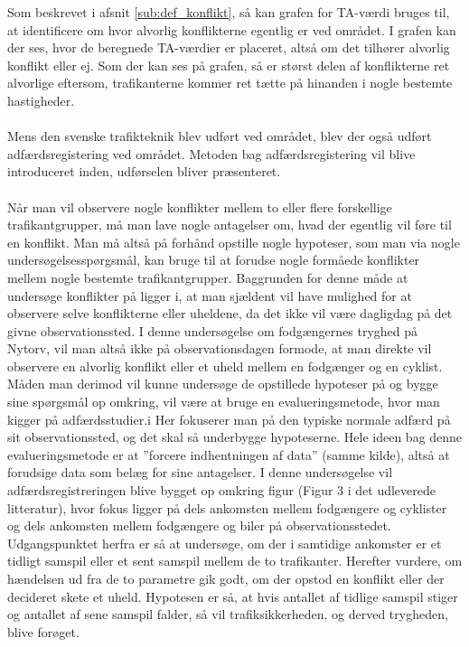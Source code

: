 Som beskrevet i afsnit \cref{sub:def_konflikt}, så kan grafen for TA-værdi bruges til, at identificere om hvor alvorlig konflikterne egentlig er ved området. I grafen kan der ses, hvor de beregnede TA-værdier er placeret, altså om det tilhører alvorlig konflikt eller ej.
Som der kan ses på grafen, så er størst delen af konflikterne ret alvorlige eftersom, trafikanterne kommer ret tætte på hinanden i nogle bestemte hastigheder.
\\\\
Mens den svenske trafikteknik blev udført ved området, blev der også udført adfærdsregistering ved området. Metoden bag adfærdsregistering vil blive introduceret inden, udførselen bliver præsenteret.\\\\
Når	man	vil	observere	nogle	konflikter	mellem	to	eller	flere	forskellige trafikantgrupper,	må	man	lave	nogle	antagelser	om,	hvad	der	egentlig	vil	føre	til	en konflikt.	Man	må	altså	på	forhånd	opstille	nogle	hypoteser,	som	man	via	nogle undersøgelsesspørgsmål,	kan	bruge	til	at	forudse	nogle	formåede	konflikter	mellem nogle	bestemte	trafikantgrupper.	Baggrunden	for	denne	måde	at	undersøge konflikter	på ligger	i,	at	man	sjældent	vil	have	mulighed	for	at	observere	selve konflikterne	eller	uheldene,	da	det	ikke	vil	være	dagligdag	på	det	givne observationssted.	I	denne	undersøgelse	om	fodgængernes	tryghed	på	Nytorv,	vil man altså	ikke	på	observationsdagen	formode,	at	man direkte	vil	observere en alvorlig	konflikt	eller	et	uheld	mellem	en	fodgænger	og	en	cyklist.	Måden	man derimod	vil	kunne	undersøge	de	opstillede	hypoteser	på	og	bygge	sine	spørgsmål	op omkring,	vil	være	at	bruge	en	evalueringsmetode,	hvor	man	kigger	på adfærdsstudier.i Her	fokuserer	man	på	den	typiske	normale	adfærd	på	sit observationssted, og	det	skal	så	underbygge	hypoteserne. Hele	ideen	bag	denne evalueringsmetode	er	at	”forcere indhentningen	af	data”	(samme	kilde),	altså	at forudsige	data	som	belæg	for	sine	antagelser.
I	denne	undersøgelse	vil	adfærdsregistreringen	blive	bygget	op	omkring	figur	(Figur 3	i	det	udleverede	litteratur),	hvor	fokus	ligger	på	dels	ankomsten	mellem fodgængere	og	cyklister	og	dels	ankomsten	mellem	fodgængere	og	biler på observationsstedet. Udgangspunktet	herfra	er	så	at	undersøge,	om	der	i	samtidige ankomster	er	et	tidligt	samspil	eller	et	sent	samspil	mellem	de	to	trafikanter. Herefter	vurdere,	om	hændelsen ud	fra	de	to	parametre	gik	godt,	om	der	opstod	en konflikt	eller	der	decideret	skete	et	uheld.	Hypotesen	er	så,	at	hvis	antallet	af	tidlige samspil	stiger	og	antallet	af	sene	samspil	falder,	så	vil	trafiksikkerheden,	og	derved trygheden,	blive	forøget.
